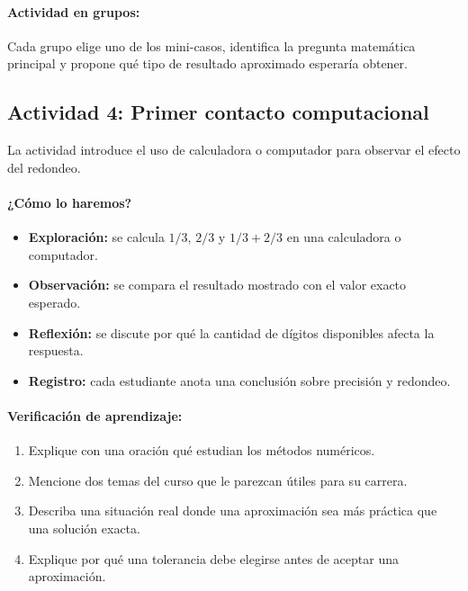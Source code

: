 \documentclass[a4,11pt]{aleph-notas}
\begin{document}
\paragraph{Actividad en grupos:}
Cada grupo elige uno de los mini-casos, identifica la pregunta matemática principal y propone qué tipo de resultado aproximado esperaría obtener.

\subsection*{Actividad 4: Primer contacto computacional}

La actividad introduce el uso de calculadora o computador para observar el efecto del redondeo.

\paragraph{¿Cómo lo haremos?}
\begin{itemize}[leftmargin=*]
    \item \textbf{Exploración:} se calcula $1/3$, $2/3$ y $1/3+2/3$ en una calculadora o computador.
    \item \textbf{Observación:} se compara el resultado mostrado con el valor exacto esperado.
    \item \textbf{Reflexión:} se discute por qué la cantidad de dígitos disponibles afecta la respuesta.
    \item \textbf{Registro:} cada estudiante anota una conclusión sobre precisión y redondeo.
\end{itemize}

\paragraph{Verificación de aprendizaje:}
\begin{enumerate}[leftmargin=*]
    \item Explique con una oración qué estudian los métodos numéricos.
    \item Mencione dos temas del curso que le parezcan útiles para su carrera.
    \item Describa una situación real donde una aproximación sea más práctica que una solución exacta.
    \item Explique por qué una tolerancia debe elegirse antes de aceptar una aproximación.
\end{enumerate}
\end{document}
